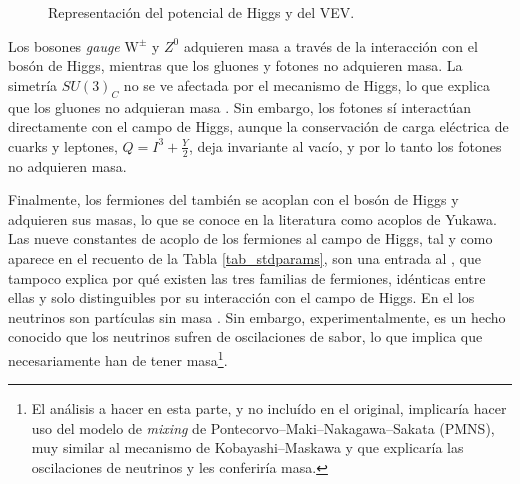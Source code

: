 \begin{figure}[H]
\centering

\color{norm}


\caption{Representación del potencial de Higgs y del VEV.} \label{fig_higgspot}  
\end{figure}



Los bosones \emph{gauge} $\mathrm{W}^{\pm}$ y $Z^0$ adquieren masa a través de la interacción con el bosón de Higgs, mientras que los gluones y fotones no adquieren masa. La simetría $SU(3)_C$ no se ve afectada por el mecanismo de Higgs, lo que explica que los gluones no adquieran masa%
. Sin embargo, los fotones sí interactúan directamente con el campo de Higgs, aunque la conservación de carga eléctrica de cuarks y leptones, $Q = I^3 + \frac{Y}{2}$, deja invariante al vacío, y por lo tanto los fotones no adquieren masa. 

Finalmente, los fermiones del \stdmod también se acoplan con el bosón de Higgs y adquieren sus masas, lo que se conoce en la literatura como acoplos de Yukawa. Las nueve constantes de acoplo de los fermiones al campo de Higgs, tal y como aparece en el recuento de la Tabla \ref{tab_stdparams}, son una entrada al \stdmod, que tampoco  explica por qué existen las tres familias de fermiones, idénticas entre ellas y solo distinguibles por su interacción con el campo de Higgs. En el \stdmod los neutrinos son partículas sin masa%
. Sin embargo, experimentalmente, es un hecho conocido que los neutrinos sufren de oscilaciones de sabor, lo que implica que necesariamente han de tener masa\footnote{\label{fn_pmns}El análisis a hacer en esta parte, y no incluído en el \stdmod original, implicaría hacer uso del modelo de \emph{mixing} de Pontecorvo--Maki--Nakagawa--Sakata (PMNS), muy similar al mecanismo de Kobayashi--Maskawa y que explicaría las oscilaciones de neutrinos y les conferiría masa.}.



